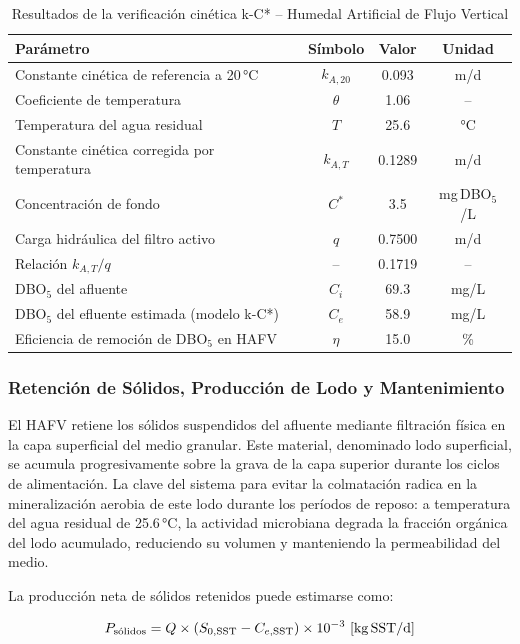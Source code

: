 \documentclass[12pt,a4paper]{article}
\begin{document}
\begin{table}[H]
\centering
\caption{Resultados de la verificación cinética k-C* -- Humedal Artificial de Flujo Vertical}
\label{tab:verificacion_kC}
\begin{tabular}{lccc}
\toprule
\textbf{Parámetro} & \textbf{Símbolo} & \textbf{Valor} & \textbf{Unidad} \\
\midrule
Constante cinética de referencia a 20\,°C & $k_{A,20}$ & 0.093 & m/d \\
Coeficiente de temperatura & $\theta$ & 1.06 & -- \\
Temperatura del agua residual & $T$ & 25.6 & °C \\
Constante cinética corregida por temperatura & $k_{A,T}$ & 0.1289 & m/d \\
Concentración de fondo & $C^*$ & 3.5 & mg\,DBO$_5$/L \\
Carga hidráulica del filtro activo & $q$ & 0.7500 & m/d \\
Relación $k_{A,T} / q$ & -- & 0.1719 & -- \\
DBO$_5$ del afluente & $C_i$ & 69.3 & mg/L \\
DBO$_5$ del efluente estimada (modelo k-C*) & $C_e$ & 58.9 & mg/L \\
Eficiencia de remoción de DBO$_5$ en HAFV & $\eta$ & 15.0 & \% \\
\bottomrule
\end{tabular}
\end{table}


\subsubsection*{Retención de Sólidos, Producción de Lodo y Mantenimiento}

El HAFV retiene los sólidos suspendidos del afluente mediante filtración física en la capa superficial del medio granular. Este material, denominado lodo superficial, se acumula progresivamente sobre la grava de la capa superior durante los ciclos de alimentación. La clave del sistema para evitar la colmatación radica en la mineralización aerobia de este lodo durante los períodos de reposo: a temperatura del agua residual de 25.6\,°C, la actividad microbiana degrada la fracción orgánica del lodo acumulado, reduciendo su volumen y manteniendo la permeabilidad del medio.

La producción neta de sólidos retenidos puede estimarse como:

\begin{equation}
P_\text{sólidos} = Q \times (S_{0,\text{SST}} - C_{e,\text{SST}}) \times 10^{-3}\ \text{[kg\,SST/d]}
\end{equation}
\end{document}
